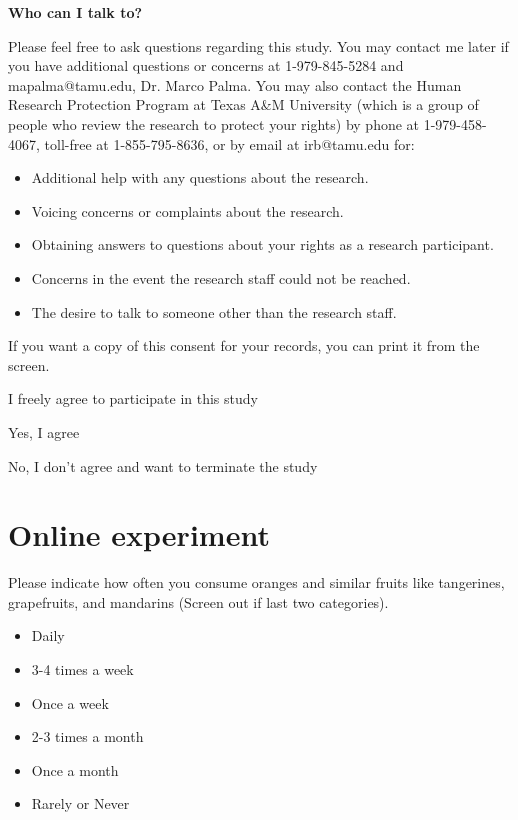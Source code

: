 \documentclass[12pt]{article}
\begin{document}
\textbf{Who can I talk to?} \par

Please feel free to ask questions regarding this study. You may contact me later if you have additional questions or concerns at 1-979-845-5284 and mapalma@tamu.edu, Dr. Marco Palma. You may also contact the Human Research Protection Program at Texas A\&M University (which is a group of people who review the research to protect your rights) by phone at 1-979-458-4067, toll-free at 1-855-795-8636, or by email at irb@tamu.edu for:\par

\begin{itemize}
    \item Additional help with any questions about the research.
    \item Voicing concerns or complaints about the research.
    \item Obtaining answers to questions about your rights as a research participant.
    \item Concerns in the event the research staff could not be reached.
    \item The desire to talk to someone other than the research staff.
\end{itemize} \par



If you want a copy of this consent for your records, you can print it from the screen. \par

I freely agree to participate in this study \par
[Dropdown menu options:] \par
Yes, I agree \par

No, I don't agree and want to terminate the study

\section{Online experiment}

 Please indicate how often you consume oranges and similar fruits like tangerines, grapefruits, and mandarins (Screen out if last two categories).  

\begin{itemize}
    \item Daily
    \item 3-4 times a week
    \item Once a week
    \item 2-3 times a month
    \item Once a month
    \item Rarely or Never
\end{itemize}
\end{document}
